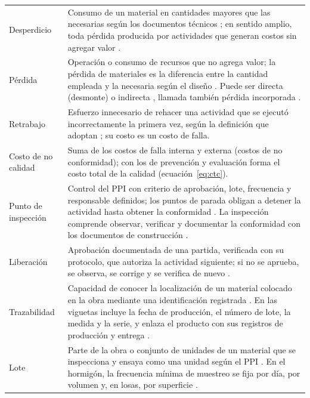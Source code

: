 \begin{longtable}{@{}P{3.1cm}P{12.7cm}@{}}
\addlinespace
Desperdicio & Consumo de un material en cantidades mayores que las necesarias según los documentos técnicos \parencite[p.~9]{galarza2011}; en sentido amplio, toda pérdida producida por actividades que generan costos sin agregar valor \parencite[p.~328]{formoso1999}. \\
\addlinespace
Pérdida & Operación o consumo de recursos que no agrega valor; la pérdida de materiales es la diferencia entre la cantidad empleada y la necesaria según el diseño \parencite[sección~2]{rossi2001}. Puede ser directa (desmonte) o indirecta \parencite[p.~15]{ccoyllo2016}, llamada también pérdida incorporada \parencite[p.~106]{maciel2016}. \\
\addlinespace
Retrabajo & Esfuerzo innecesario de rehacer una actividad que se ejecutó incorrectamente la primera vez, según la definición que adoptan \textcite[p.~2]{forcada2017}; su costo es un costo de falla. \\
\addlinespace
Costo de no calidad & Suma de los costos de falla interna y externa (costos de no conformidad); con los de prevención y evaluación forma el costo total de la calidad \parencite[p.~150]{zurita2024} (ecuación~\ref{eq:ctc}). \\
\addlinespace
Punto de inspección & Control del PPI con criterio de aprobación, lote, frecuencia y responsable definidos; los puntos de parada obligan a detener la actividad hasta obtener la conformidad \parencite[anexo~4]{muro2020}. La inspección comprende observar, verificar y documentar la conformidad con los documentos de construcción \parencite[sección~2.3, p.~43]{aci318_2025}. \\
\addlinespace
Liberación & Aprobación documentada de una partida, verificada con su protocolo, que autoriza la actividad siguiente; si no se aprueba, se observa, se corrige y se verifica de nuevo \parencite[pp.~62--64]{gudiel2020}. \\
\addlinespace
Trazabilidad & Capacidad de conocer la localización de un material colocado en la obra mediante una identificación registrada \parencite[anexo~4]{muro2020}. En las viguetas incluye la fecha de producción, el número de lote, la medida y la serie, y enlaza el producto con sus registros de producción y entrega \parencite[p.~117]{capcha2016}. \\
\addlinespace
Lote & Parte de la obra o conjunto de unidades de un material que se inspecciona y ensaya como una unidad según el PPI \parencite[anexo~4]{muro2020}. En el hormigón, la frecuencia mínima de muestreo se fija por día, por volumen y, en losas, por superficie \parencite[sección~26.12.2.1, p.~603]{aci318_2025}. \\

\end{longtable}
